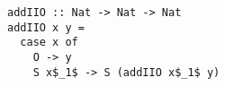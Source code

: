 \begin{figure}[!t]
  \centering
  \begin{minipage}{\columnwidth}
    \begin{lstlisting}[frame=tb]
addIIO :: Nat -> Nat -> Nat
addIIO x y =
  case x of
    O -> y
    S x$_1$ -> S (addIIO x$_1$ y)
    \end{lstlisting}
  \end{minipage}
\end{figure}
